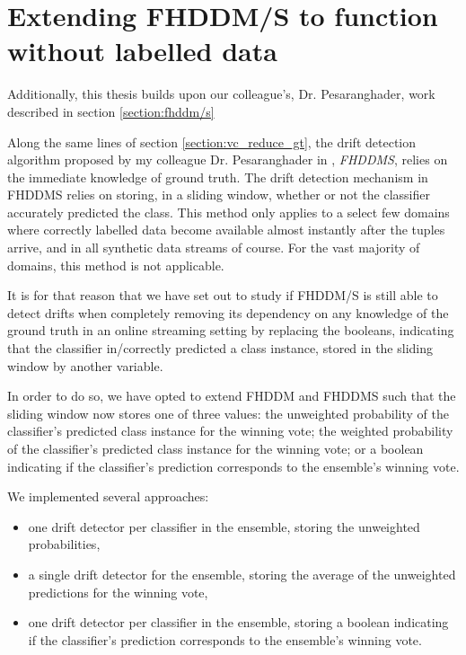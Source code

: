 \section{Extending FHDDM/S to function without labelled data}

Additionally, this thesis builds upon our colleague's, Dr. Pesaranghader, work described in section \ref{section:fhddm/s}

Along the same lines of section \ref{section:vc_reduce_gt}, the drift detection algorithm proposed by my colleague Dr. Pesaranghader in \cite{pesaranghader2016fast}, \textit{FHDDMS}, relies on the immediate knowledge of ground truth. The drift detection mechanism in FHDDMS relies on storing, in a sliding window, whether or not the classifier accurately predicted the class. This method only applies to a select few domains where correctly labelled data become available almost instantly after the tuples arrive, and in all synthetic data streams of course. For the vast majority of domains, this method is not applicable.

It is for that reason that we have set out to study if FHDDM/S is still able to detect drifts when completely removing its dependency on any knowledge of the ground truth in an online streaming setting by replacing the booleans, indicating that the classifier in/correctly predicted a class instance, stored in the sliding window by another variable.

In order to do so, we have opted to extend FHDDM and FHDDMS such that the sliding window now stores one of three values: the unweighted probability of the classifier's predicted class instance for the winning vote; the weighted probability of the classifier's predicted class instance for the winning vote; or a boolean indicating if the classifier's prediction corresponds to the ensemble's winning vote.

We implemented several approaches:
\begin{itemize}
\item one drift detector per classifier in the ensemble, storing the unweighted probabilities,
\item a single drift detector for the ensemble, storing the average of the unweighted predictions for the winning vote,
\item one drift detector per classifier in the ensemble, storing a boolean indicating if the classifier's prediction corresponds to the ensemble's winning vote.
\end{itemize}


